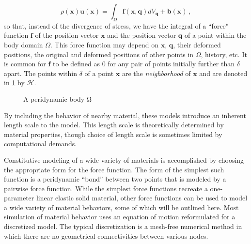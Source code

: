 %
\begin{equation}
\label{eq:PDCoPV}
\rho(\mathbf{x})\ddot{\mathbf{u}}(\mathbf{x}) = \int_\Omega \mathbf{f}(\mathbf{x},\mathbf{q}) dV_\mathbf{q}  + \mathbf{b}(\mathbf{x})\, ,
\end{equation}
%
so that, instead of the divergence of stress, we have the integral of a ``force" function $\mathbf{f}$ of the position vector $\mathbf{x}$ and the position vector $\mathbf{q}$ of a point within the body domain $\Omega$. 
This force function may depend on \(\mathbf{x}\), \(\mathbf{q}\), their deformed positions, the original and deformed positions of other points in \(\Omega\), history, etc.
It is common for \(\mathbf{f}\) to be defined as \(0\) for any pair of points initially further than \(\delta\) apart. 
The points within \(\delta\) of a point \(\mathbf{x}\) are the \textit{neighborhood} of \(\mathbf{x}\) and are denoted in \cref{fig:PDbody} by \(\mathcal{H}\).
%
\begin{figure}[h]
  \centering
{}
\caption{A peridynamic body \protect\(\Omega\protect\)}
\label{fig:PDbody}
\end{figure}
% 
By including the behavior of nearby material, these models introduce an inherent length scale to the model. 
This length scale is theoretically determined by material properties, though choice of length scale is sometimes limited by computational demands.

Constitutive modeling of a wide variety of materials is accomplished by choosing the appropriate form for the force function.
The form of the simplest such function is a peridynamic ``bond'' between two points that is modeled by a pairwise force function.
While the simplest force functions recreate a one-parameter linear elastic solid material, other force functions can be used to model a wide variety of material behaviors, some of which will be outlined here.
Most simulation of material behavior uses an equation of motion reformulated for a discretized model.
The typical discretization is a mesh-free numerical method in which there are no geometrical connectivities between various nodes.

